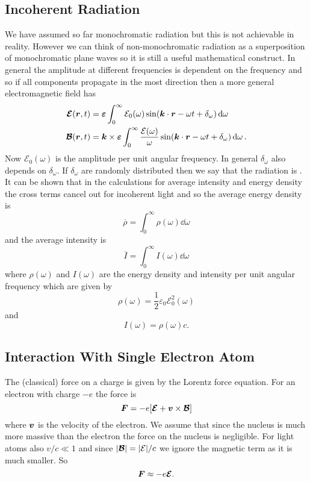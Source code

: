 \documentclass[a4paper]{article}
\newcommand{\Efield}{\mathcal{E}}
\newcommand{\Bfield}{\mathcal{B}}
\newcommand{\mean}[1]{\overline{#1}}
\begin{document}
    \subsection{Incoherent Radiation}
    We have assumed so far monochromatic radiation but this is not achievable in reality.
    However we can think of non-monochromatic radiation as a superposition of monochromatic plane waves so it is still a useful mathematical construct.
    In general the amplitude at different frequencies is dependent on the frequency and so if all components propagate in the most direction then a more general electromagnetic field has
    \begin{align*}
        \vv{\Efield}(\vv{r}, t) &= \vv{\varepsilon}\int_{0}^{\infty} \Efield_0(\omega) \sin(\vv{k}\cdot\vv{r} - \omega t + \delta_{\omega}) \dd{\omega}\\
        \vv{\Bfield}(\vv{r}, t) &= \vv{k}\times\vv{\varepsilon} \int_{0}^{\infty} \frac{\Efield(\omega)}{\omega}\sin(\vv{k}\cdot\vv{r} - \omega t + \delta_{\omega})\dd{\omega}.
    \end{align*}
    Now \(\Efield_0(\omega)\) is the amplitude per unit angular frequency.
    In general \(\delta_{\omega}\) also depends on \(\delta_{\omega}\).
    If \(\delta_{\omega}\) are randomly distributed then we say that the radiation is .
    It can be shown that in the calculations for average intensity and energy density the cross terms cancel out for incoherent light and so the average energy density is
    \[\mean{\rho} = \int_{0}^{\infty} \rho(\omega)\dd{\omega}\]
    and the average intensity is
    \[\mean{I} = \int_{0}^{\infty} I(\omega)\dd{\omega}\]
    where \(\rho(\omega)\) and \(I(\omega)\) are the energy density and intensity per unit angular frequency which are given by
    \[\rho(\omega) = \frac{1}{2}\varepsilon_0\Efield_0^2(\omega)\]
    and
    \[I(\omega) = \rho(\omega)c.\]
    
    \subsection{Interaction With Single Electron Atom}
    The (classical) force on a charge is given by the Lorentz force equation.
    For an electron with charge \(-e\) the force is
    \[\vv{F} = -e[\vv{\Efield} + \vv{v}\times\vv{\Bfield}]\]
    where \(\bm{v}\) is the velocity of the electron.
    We assume that since the nucleus is much more massive than the electron the force on the nucleus is negligible.
    For light atoms also \(v/c \ll 1\) and since \(\abs{\vv{\Bfield}} = \abs{\Efield}/c\) we ignore the magnetic term as it is much smaller.
    So
    \[\vv{F} \approx -e\vv{\Efield}.\]
    
\end{document}
